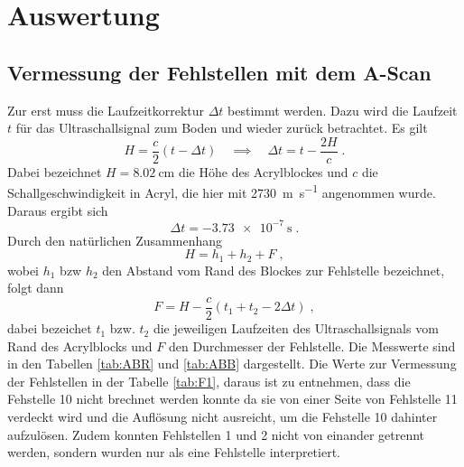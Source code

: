 \section{Auswertung}
\label{sec:Auswertung}

\subsection{Vermessung der Fehlstellen mit dem A-Scan}
Zur erst muss die Laufzeitkorrektur $\Delta t$ bestimmt werden.
Dazu wird die Laufzeit $t$
für das Ultraschallsignal zum Boden und wieder zurück betrachtet.
Es gilt
\begin{equation*}
  H = \frac{c}{2} \left( t -\Delta t\right)
  \quad \implies \quad
  \Delta t = t - \frac{2H}{c}\;.
\end{equation*}
Dabei bezeichnet $H = \SI{8.02}{\centi\meter}$ die Höhe des Acrylblockes
und $c$ die Schallgeschwindigkeit
in Acryl, die hier mit \SI{2730}{\meter \per \second} \cite{oly} angenommen wurde.
Daraus ergibt sich
\begin{equation*}
  \Delta t = -\SI{3.73e-7}{\second}\;.
\end{equation*}
Durch den natürlichen Zusammenhang
\begin{equation*}
  H = h_1 + h_2 + F \; ,
\end{equation*}
wobei $ h_1 $ bzw $ h_2$ den Abstand vom Rand des Blockes zur Fehlstelle
bezeichnet, folgt dann
\begin{equation}
  F = H-\frac{c}{2}\left(t_1 +t_2 - 2\Delta t \right) \; ,
  \label{eqn:F}
\end{equation}
dabei bezeichet $t_1$ bzw. $t_2$ die jeweiligen Laufzeiten des Ultraschallsignals
vom Rand des Acrylblocks und $F$ den Durchmesser der Fehlstelle. Die Messwerte
sind in den Tabellen \ref{tab:ABR} und \ref{tab:ABB} dargestellt. Die Werte
zur Vermessung der Fehlstellen in der Tabelle \ref{tab:F1}, daraus ist zu
entnehmen, dass die Fehstelle 10 nicht brechnet werden konnte da sie von
einer Seite von Fehlstelle 11 verdeckt wird und die Auflösung nicht ausreicht,
um die Fehstelle 10 dahinter aufzulösen. Zudem konnten Fehlstellen 1 und 2
nicht von einander getrennt werden, sondern wurden nur als eine Fehlstelle
interpretiert.
